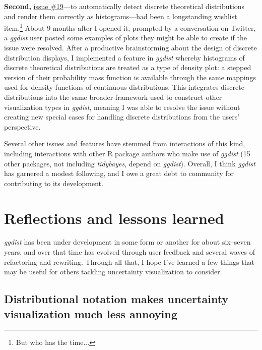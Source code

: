 \documentclass[journal]{vgtc}              %
\begin{document}
\textbf{Second,} \href{https://github.com/mjskay/ggdist/issues/19}{issue \#19}---to automatically detect discrete theoretical distributions and render them correctly as histograms---had been a longstanding wishlist item.\footnote{But who has the time...} About 9 months after I opened it, prompted by a conversation on Twitter, a \textit{ggdist} user posted some examples of plots they might be able to create if the issue were resolved. After a productive brainstorming about the design of discrete distribution displays, I implemented a feature in \textit{ggdist} whereby histograms of discrete theoretical distributions are treated as a type of density plot: a stepped version of their probability mass function is available through the same mappings used for density functions of continuous distributions. This integrates discrete distributions into the same broader framework used to construct other visualization types in \textit{ggdist}, meaning I was able to resolve the issue without creating new special cases for handling discrete distributions from the users' perspective.

Several other issues and features have stemmed from interactions of this kind, including interactions with other R package authors who make use of \textit{ggdist}  (15 other packages, not including \textit{tidybayes}, depend on \textit{ggdist}). Overall, I think \textit{ggdist} has garnered a modest following, and I owe a great debt to community for contributing to its development.

\section{Reflections and lessons learned}

\textit{ggdist} has been under development in some form or another for about six--seven years, and over that time has evolved through user feedback and several waves of refactoring and rewriting. Through all that, I hope I've learned a few things that may be useful for others tackling uncertainty visualization to consider.

\subsection{Distributional notation makes uncertainty visualization much less annoying}

\end{document}
